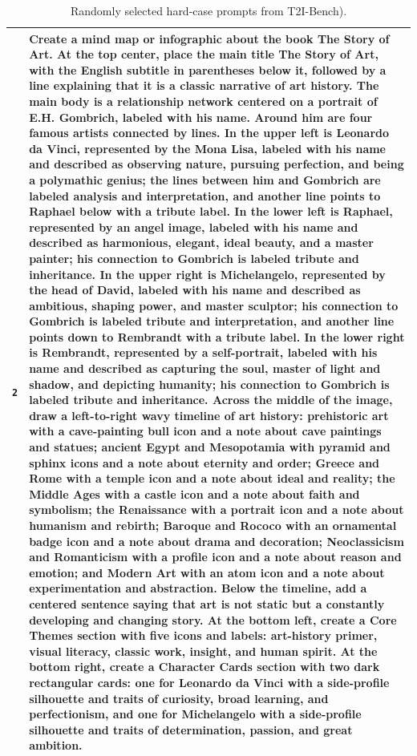 \documentclass{llmxive}
\begin{document}
\begin{table}[t]
{\begin{tabular}{p{}p{}}
\midrule
\texttt{2} &
Create a mind map or infographic about the book The Story of Art. At the top center, place the main title The Story of Art, with the English subtitle in parentheses below it, followed by a line explaining that it is a classic narrative of art history. The main body is a relationship network centered on a portrait of E.H. Gombrich, labeled with his name. Around him are four famous artists connected by lines. In the upper left is Leonardo da Vinci, represented by the Mona Lisa, labeled with his name and described as observing nature, pursuing perfection, and being a polymathic genius; the lines between him and Gombrich are labeled analysis and interpretation, and another line points to Raphael below with a tribute label. In the lower left is Raphael, represented by an angel image, labeled with his name and described as harmonious, elegant, ideal beauty, and a master painter; his connection to Gombrich is labeled tribute and inheritance. In the upper right is Michelangelo, represented by the head of David, labeled with his name and described as ambitious, shaping power, and master sculptor; his connection to Gombrich is labeled tribute and interpretation, and another line points down to Rembrandt with a tribute label. In the lower right is Rembrandt, represented by a self-portrait, labeled with his name and described as capturing the soul, master of light and shadow, and depicting humanity; his connection to Gombrich is labeled tribute and inheritance. Across the middle of the image, draw a left-to-right wavy timeline of art history: prehistoric art with a cave-painting bull icon and a note about cave paintings and statues; ancient Egypt and Mesopotamia with pyramid and sphinx icons and a note about eternity and order; Greece and Rome with a temple icon and a note about ideal and reality; the Middle Ages with a castle icon and a note about faith and symbolism; the Renaissance with a portrait icon and a note about humanism and rebirth; Baroque and Rococo with an ornamental badge icon and a note about drama and decoration; Neoclassicism and Romanticism with a profile icon and a note about reason and emotion; and Modern Art with an atom icon and a note about experimentation and abstraction. Below the timeline, add a centered sentence saying that art is not static but a constantly developing and changing story. At the bottom left, create a Core Themes section with five icons and labels: art-history primer, visual literacy, classic work, insight, and human spirit. At the bottom right, create a Character Cards section with two dark rectangular cards: one for Leonardo da Vinci with a side-profile silhouette and traits of curiosity, broad learning, and perfectionism, and one for Michelangelo with a side-profile silhouette and traits of determination, passion, and great ambition. \\
\bottomrule
\end{tabular}
}
\caption{Randomly selected hard-case prompts from T2I-Bench).}
\label{tab:t2i_bench_hard_cases}
\end{table}
\end{document}
